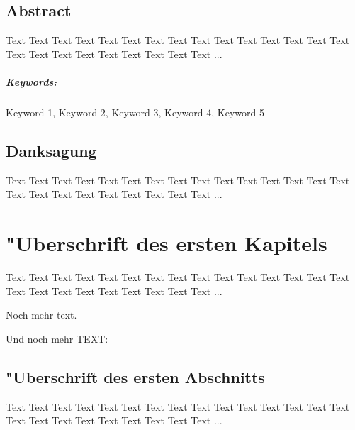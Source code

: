 \documentclass[a4paper,bibtotoc,oneside]{scrbook}
\begin{document}
\newpage

\section*{Abstract}\thispagestyle{empty}
Text Text Text Text Text Text Text Text Text Text Text Text Text Text Text Text Text Text Text Text Text Text Text Text ...
\\ \vfill
\paragraph*{Keywords:} Keyword 1, Keyword 2, Keyword 3, Keyword 4, Keyword 5
\newpage

\section*{Danksagung}\thispagestyle{empty}
Text Text Text Text Text Text Text Text Text Text Text Text Text Text Text Text Text Text Text Text Text Text Text Text ...
\newpage

\tableofcontents\thispagestyle{empty}
\newpage

\setcounter{page}{1}

\chapter[Erstes Kapitel]{"Uberschrift des ersten Kapitels}

Text Text Text Text Text Text Text Text Text Text Text Text Text Text Text Text Text Text Text Text Text Text Text Text ...

Noch mehr text.

Und noch mehr TEXT:

\section[Erster Abschnitt]{"Uberschrift des ersten Abschnitts}

Text Text Text Text Text Text Text Text Text Text Text Text Text Text Text Text Text Text Text Text Text Text Text Text ...
\end{document}
